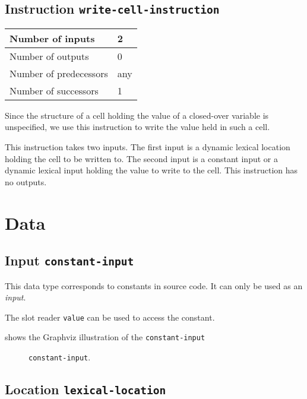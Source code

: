 \subsection{Instruction \texttt{write-cell-instruction}}
\label{mir-instruction-write-cell}

\begin{tabular}{|l|l|}
\hline
Number of inputs & 2\\
\hline
Number of outputs & 0\\
\hline
Number of predecessors & any\\
\hline
Number of successors & 1\\
\hline
\end{tabular}

Since the structure of a cell holding the value of a closed-over
variable is unspecified, we use this instruction to write the value
held in such a cell.

This instruction takes two inputs. The first input is a dynamic
lexical location holding the cell to be written to.  The second input
is a constant input or a dynamic lexical input holding the value to
write to the cell.  This instruction has no outputs.

\section{Data}

\subsection{Input \texttt{constant-input}}

This data type corresponds to constants in source code.  It can only
be used as an \emph{input}.

The slot reader \texttt{value} can be used to access the constant. 

 shows the Graphviz illustration of the
\texttt{constant-input}

\begin{figure}
\begin{center}
\end{center}
\caption{\label{fig-constant-input}
\texttt{constant-input}.}
\end{figure}

\subsection{Location \texttt{lexical-location}}

